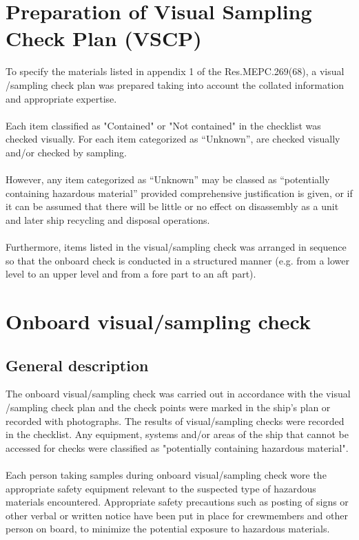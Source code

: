 \documentclass{article}
\begin{document}
\section{Preparation of Visual Sampling Check Plan (VSCP)}
To specify the materials listed in appendix 1 of the Res.MEPC.269(68), a visual
/sampling check plan was prepared taking into account the collated information
and appropriate expertise. \\ \\
Each item classified as "Contained" or "Not contained" in the checklist was
checked visually. For each item categorized as “Unknown”, are checked visually
and/or checked by sampling. \\ \\
However, any item categorized as “Unknown” may be classed as “potentially
containing hazardous material” provided comprehensive justification is given, or
if it can be assumed that there will be little or no effect on disassembly as a unit
and later ship recycling and disposal operations. \\ \\
Furthermore, items listed in the visual/sampling check was arranged in
sequence so that the onboard check is conducted in a structured manner (e.g.
from a lower level to an upper level and from a fore part to an aft part). 

\section{Onboard visual/sampling check}

\subsection{General description}

The onboard visual/sampling check was carried out in accordance with the visual
/sampling check plan and the check points were marked in the ship’s plan or
recorded with photographs. The results of visual/sampling checks were
recorded in the checklist. Any equipment, systems and/or areas of the ship that
cannot be accessed for checks were classified as "potentially containing
hazardous material". \\ \\
Each person taking samples during onboard visual/sampling check wore the
appropriate safety equipment relevant to the suspected type of hazardous
materials encountered. Appropriate safety precautions such as posting of signs
or other verbal or written notice have been put in place for crewmembers and
other person on board, to minimize the potential exposure to hazardous
materials.
\end{document}
